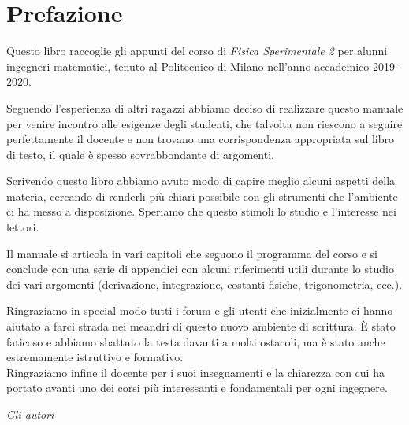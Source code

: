 \section*{Prefazione}

Questo libro raccoglie gli appunti del corso di \emph{Fisica Sperimentale 2} per alunni ingegneri matematici, tenuto al Politecnico di Milano nell'anno accademico 2019-2020.

Seguendo l'esperienza di altri ragazzi abbiamo deciso di realizzare questo manuale per venire incontro alle esigenze degli studenti, che talvolta non riescono a seguire perfettamente il docente e non trovano una corrispondenza appropriata sul libro di testo, il quale è spesso sovrabbondante di argomenti.

Scrivendo questo libro abbiamo avuto modo di capire meglio alcuni aspetti della materia, cercando di renderli più chiari possibile con gli strumenti che l'ambiente \latex ci ha messo a disposizione. Speriamo che questo stimoli lo studio e l'interesse nei lettori.

Il manuale si articola in vari capitoli che seguono il programma del corso e si conclude con una serie di appendici con alcuni riferimenti utili durante lo studio dei vari argomenti (derivazione, integrazione, costanti fisiche, trigonometria, ecc.).

Ringraziamo in special modo tutti i forum e gli utenti che inizialmente ci hanno aiutato a farci strada nei meandri di questo nuovo ambiente di scrittura. È stato faticoso e abbiamo sbattuto la testa davanti a molti ostacoli, ma è stato anche estremamente istruttivo e formativo.\\
Ringraziamo infine il docente per i suoi insegnamenti e la chiarezza con cui ha portato avanti uno dei corsi più interessanti e fondamentali per ogni ingegnere.

\begin{flushright}
	\emph{Gli autori} \hspace*{2cm}
\end{flushright}